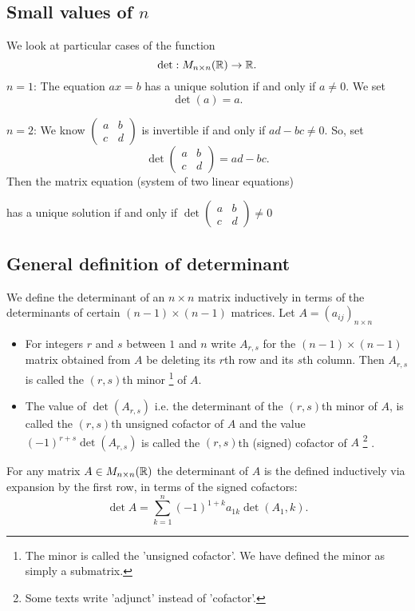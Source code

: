 \documentclass[10pt, a4paper]{article}
\begin{document}
\subsection{Small values of $n$}
We look at particular cases of the function
\[
\det : M_{n\times n}(\mathbb{R}) \rightarrow \mathbb{R}.
\]
$n = 1$:
The equation $ax = b$ has a unique solution if and only if $a \neq 0$.
We set
\[
\det(a) = a.
\]

$n = 2$:
We know $\begin{pmatrix}
    a & b \\ c & d
\end{pmatrix}$
is invertible if and only if $ad - bc \neq 0$.
So, set
\[
\det\begin{pmatrix}
    a & b \\ c & d
\end{pmatrix} = ad - bc.
\]
Then the matrix equation (system of two linear equations)

has a unique solution if and only if $\det\begin{pmatrix}
    a & b \\ c & d
\end{pmatrix} \neq 0$

\subsection{General definition of determinant}
We define the determinant of an $n \times n$ matrix inductively in terms of the determinants of certain $(n - 1)\times (n - 1)$ matrices.
Let $A = (a_{ij})_{n \times n}$
\begin{itemize}
    \item For integers $r$ and $s$ between $1$ and $n$ write $A_{r, s}$ for the $(n - 1)\times (n - 1)$ matrix obtained from $A$ be deleting its $r$th row and its $s$th column.
    Then $A_{r, s}$ is called the $(r, s)$th minor
    \footnote{The minor is called the 'unsigned cofactor'.
    We have defined the minor as simply a submatrix.}
    of $A$.
    \item The value of $\det(A_{r, s})$ i.e. the determinant of the $(r, s)$th minor of $A$,
    is called the $(r, s)$th unsigned cofactor of $A$ and the value $(-1) ^ {r + s}\det(A_{r, s})$ is called the $(r, s)$th (signed) cofactor of $A$
    \footnote{Some texts write 'adjunct' instead of 'cofactor'.}
    .
\end{itemize}

For any matrix $A \in M_{n \times n}(\mathbb{R})$ the determinant of $A$ is the defined inductively via expansion by the first row,
in terms of the signed cofactors:
\[
\det A = \sum_{k = 1}^{n}(-1) ^ {1 + k}a_{1k}\det(A_1, k).
\]
\end{document}
